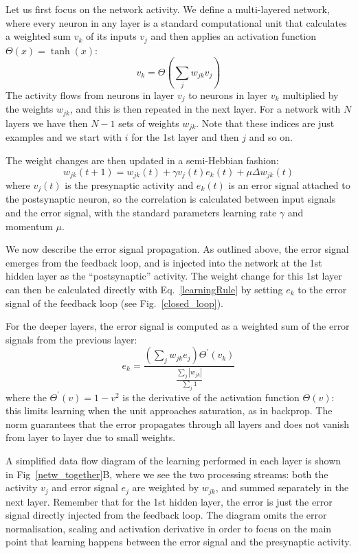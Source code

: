 \documentclass{article}
\begin{document}
Let us first focus on the network activity. We define a multi-layered
network, where every neuron in any layer is a standard computational unit that
calculates a weighted sum $v_k$ of its inputs $v_j$ and then applies
an activation function $\Theta(x) = \tanh(x)$:
\begin{equation}
  v_k = \Theta\left( \sum_j w_{jk} v_{j} \right) \label{act_sum}
\end{equation}
The activity flows from neurons in layer $v_j$ to neurons in
layer $v_k$ multiplied by the weights $w_{jk}$, and this
is then repeated in the next layer. For a network with
$N$ layers we have then $N-1$ sets of weights $w_{jk}$. Note that these
indices are just examples and we start with $i$ for the 1st layer and then
$j$ and so on.

The weight changes are then updated in a semi-Hebbian fashion:
\begin{equation}
  w_{jk}(t+1) = w_{jk}(t) + \gamma v_j(t)  e_k(t) + \mu \Delta w_{jk}(t) \label{learningRule}
\end{equation}
where $v_j(t)$ is the presynaptic activity and $e_k(t)$ is an error
signal attached to the postsynaptic neuron, so the correlation is
calculated between input signals and the error signal, with the
standard parameters learning rate $\gamma$ and momentum $\mu$.

We now describe the error signal propagation. As outlined above, the
error signal emerges from the feedback loop, and is injected into the
network at the 1st hidden layer as the ``postsynaptic'' activity. The
weight change for this 1st layer can then be calculated directly with
Eq.~\ref{learningRule} by setting $e_k$ to the error signal of the
feedback loop (see Fig.~\ref{closed_loop}).

For the deeper layers, the error signal is computed as a weighted
sum of the error signals from the previous layer:
\begin{equation}
  e_k = \frac{\left( \sum_j w_{jk} e_{j} \right) \Theta^\prime (v_k) }{\frac{\sum_j {|w_{jk}|}}{\sum_j 1}}
  \label{deepError}
\end{equation}
where the $\Theta^\prime (v) = 1 - v^2$ is the derivative of the
activation function $\Theta(v)$: this limits learning when the unit
approaches saturation, as in backprop. The norm guarantees that
the error propagates through all layers and does not vanish from
layer to layer due to small weights.

A simplified data flow diagram of the learning performed in each layer
is shown in Fig~\ref{netw_together}B, where we see the two processing
streams: both the activity $v_j$ and error signal $e_j$ are weighted
by $w_{jk}$, and summed separately in the next layer. Remember that
for the 1st hidden layer, the error is just the error signal
directly injected from the feedback loop. The diagram omits the error
normalisation, scaling and activation derivative in order to focus on
the main point that learning happens between the error signal and the
presynaptic activity.
\end{document}
